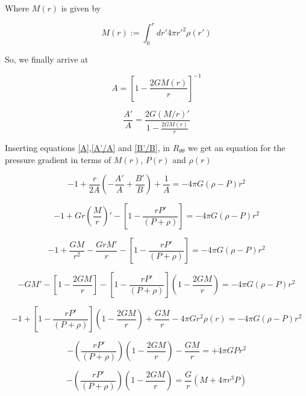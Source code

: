 Where $M(r)$ is given by

\begin{equation}\label{oreijf}
M(r):= \int_0^r dr'4\pi  r'^2 \rho(r')
\end{equation}


So, we finally arrive at 

\begin{equation}\label{A}
A = \left[ 1 - \frac{2G M(r)}{r} \right]^{-1}
\end{equation}

\begin{equation}\label{A'/A}
\frac{A'}{A} = \frac{2G(M/r)'}{1-\frac{2GM(r)}{r}}
\end{equation}


Inserting equations \ref{A},\ref{A'/A} and \ref{B'/B}, in  $R_{\theta \theta}$ we get an equation for the pressure gradient in terms of $M(r)$, $P(r)$ and $\rho(r)$

\begin{equation}
-1 + \frac{r}{2A} \left( -\frac{A'}{A} + \frac{B'}{B} \right) + \frac{1}{A} = -4\pi G(\rho - P) r^2
\end{equation}

\begin{equation}
-1 + Gr \left( \frac{M}{r}\right)' - \left[ 1-\frac{rP'}{(P+\rho)} \right] = -4\pi G(\rho - P) r^2
\end{equation}

\begin{equation}
-1 + \frac{GM}{r^2} -\frac{GrM'}{r} - \left[ 1-\frac{rP'}{(P+\rho)} \right] = -4\pi G(\rho - P) r^2
\end{equation}

\begin{equation}
-GM' - \left[ 1 - \frac{2GM}{r}\right] - \left[ 1-\frac{rP'}{(P+\rho)} \right]\left(  1 - \frac{2GM}{r} \right) = -4\pi G(\rho - P) r^2
\end{equation}

\begin{equation}
-1 + \left[ 1-\frac{rP'}{(P+\rho)} \right]\left(  1 - \frac{2GM}{r} \right)+\frac{GM}{r} - 4\pi G r^2 \rho(r) = -4\pi G(\rho - P) r^2
\end{equation}

\begin{equation}
- \left( \frac{rP'}{(P+\rho)}\right)\left(  1 - \frac{2GM}{r} \right) - \frac{GM}{r} = + 4\pi G P r^2
\end{equation}

\begin{equation}
- \left( \frac{rP'}{(P+\rho)}\right)\left(  1 - \frac{2GM}{r} \right) = \frac{G}{r} \left( M + 4\pi r^3 P \right)
\end{equation}

